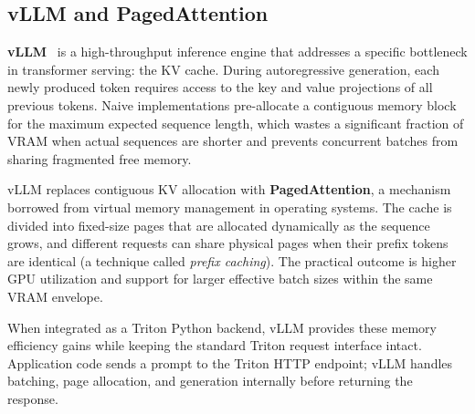 \subsection{vLLM and PagedAttention}

\textbf{vLLM}~\cite{kwon2023efficientmemorymanagementlarge} is a high-throughput inference engine that addresses a specific bottleneck in transformer serving: the KV cache. During autoregressive generation, each newly produced token requires access to the key and value projections of all previous tokens. Naive implementations pre-allocate a contiguous memory block for the maximum expected sequence length, which wastes a significant fraction of VRAM when actual sequences are shorter and prevents concurrent batches from sharing fragmented free memory.

vLLM replaces contiguous KV allocation with \textbf{PagedAttention}, a mechanism borrowed from virtual memory management in operating systems. The cache is divided into fixed-size pages that are allocated dynamically as the sequence grows, and different requests can share physical pages when their prefix tokens are identical (a technique called \textit{prefix caching}). The practical outcome is higher GPU utilization and support for larger effective batch sizes within the same VRAM envelope.

When integrated as a Triton Python backend, vLLM provides these memory efficiency gains while keeping the standard Triton request interface intact. Application code sends a prompt to the Triton HTTP endpoint; vLLM handles batching, page allocation, and generation internally before returning the response.
